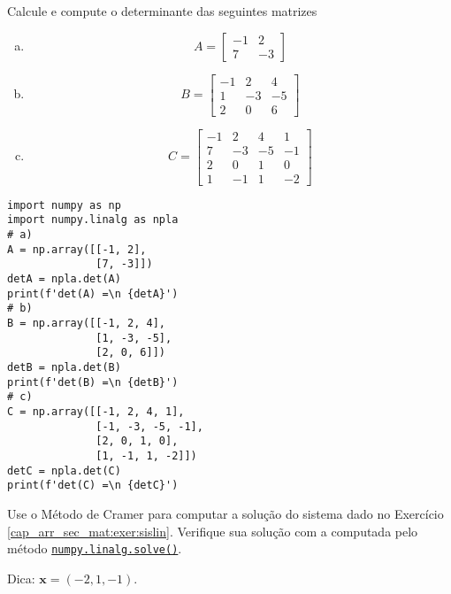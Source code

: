 \begin{exer}
  Calcule e compute o determinante das seguintes matrizes
  \begin{enumerate}[a)]
  \item
    \begin{equation}
      A =
      \begin{bmatrix}
        -1 & 2\\
        7 & -3
      \end{bmatrix}
    \end{equation}
  \item
    \begin{equation}
      B =
      \begin{bmatrix}
        -1 & 2 & 4\\
        1 & -3 & -5\\
        2 & 0 & 6
      \end{bmatrix}
    \end{equation}
  \item
    \begin{equation}
      C =
      \begin{bmatrix}
        -1 & 2 & 4 & 1\\
        7 & -3 & -5 & -1\\
        2 & 0 & 1 & 0\\
        1 & -1 & 1 & -2
      \end{bmatrix}
    \end{equation}
  \end{enumerate}
\end{exer}
\begin{resp}

\begin{lstlisting}
import numpy as np
import numpy.linalg as npla
# a)
A = np.array([[-1, 2],
              [7, -3]])
detA = npla.det(A)
print(f'det(A) =\n {detA}')
# b)
B = np.array([[-1, 2, 4],
              [1, -3, -5],
              [2, 0, 6]])
detB = npla.det(B)
print(f'det(B) =\n {detB}')
# c)
C = np.array([[-1, 2, 4, 1],
              [-1, -3, -5, -1],
              [2, 0, 1, 0],
              [1, -1, 1, -2]])
detC = npla.det(C)
print(f'det(C) =\n {detC}')
\end{lstlisting}

\end{resp}

\begin{exer}
  Use o Método de Cramer para computar a solução do sistema dado no Exercício \ref{cap_arr_sec_mat:exer:sislin}. Verifique sua solução com a computada pelo método \href{https://numpy.org/doc/stable/reference/generated/numpy.linalg.solve.html}{\lstinline+numpy.linalg.solve()+}.
\end{exer}
\begin{resp}
  Dica: $\pmb{x} = (-2, 1, -1)$.
\end{resp}

